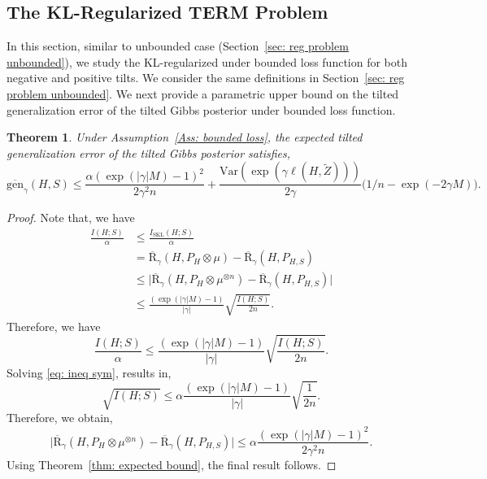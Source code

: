 \documentclass{article}
\theoremstyle{plain}
\theoremstyle{plain}
\newtheorem{theorem}{Theorem}[section]
\theoremstyle{definition}
\theoremstyle{remark}
\newcommand{\var}{\mathrm{Var}}
\newcommand{\RTT}{\overline{\mathrm{R}}_{\gamma}}
\begin{document}

\subsection{The KL-Regularized TERM Problem}\label{sec: reg problem}
In this section, similar to unbounded case (Section~\ref{sec: reg problem unbounded}), we study the KL-regularized under bounded loss function for both negative and positive tilts. We consider the same definitions in Section~\ref{sec: reg problem unbounded}. We next provide a parametric upper bound on the tilted generalization error of the tilted Gibbs posterior under bounded loss function.
 \begin{tcolorbox}
  \begin{theorem}\label{thm: tilted gibbs gen}
       Under Assumption~\ref{Ass: bounded loss}, the expected tilted generalization error of the tilted Gibbs posterior satisfies,
        \begin{equation}
            \overline{\mathrm{gen}}_{\gamma}(H,S)\leq \frac{\alpha (\exp(|\gamma| M)-1)^2}{2\gamma^2 n}+\frac{\var(\exp(\gamma \ell(H,\tilde Z)))}{2\gamma}\Big(1/n-\exp(-2\gamma M)\Big).
        \end{equation}
    \end{theorem}
    \end{tcolorbox}
\begin{proof}
    Note that, we have 
    \begin{equation}
    \begin{split}
    \frac{ I(H;S)}{\alpha} 
        &\leq\frac{ I_{\mathrm{SKL}}(H;S)}{\alpha}\\
        &= \RTT(H,P_{H}\otimes \mu)-\RTT(H,P_{H,S})\\
        &\leq \Big|\RTT(H,P_{H}\otimes \mu^{\otimes n})-\RTT(H,P_{H,S})\Big|\\
        &\leq \frac{(\exp(|\gamma| M)-1)}{|\gamma|}\sqrt{\frac{ I(H;S)}{2n}}.
    \end{split}
\end{equation}
Therefore, we have 
\begin{equation}\label{eq: ineq sym}
   \frac{ I(H;S)}{\alpha}\leq  \frac{(\exp(|\gamma| M)-1)}{|\gamma|}\sqrt{\frac{ I(H;S)}{2n}}.
\end{equation}
Solving \eqref{eq: ineq sym}, results in,
\begin{equation}
    \sqrt{I(H;S)}\leq  \alpha\frac{(\exp(|\gamma| M)-1)}{|\gamma|}\sqrt{\frac{1}{2n}} .
\end{equation}
Therefore, we obtain,
\begin{equation}
\Big|\RTT(H,P_{H}\otimes \mu^{\otimes n})-\RTT(H,P_{H,S})\Big| \leq\alpha \frac{(\exp(|\gamma| M)-1)^2}{2\gamma^2 n}.
\end{equation}
Using Theorem~\ref{thm: expected bound}, the final result follows.
\end{proof}
\end{document}
